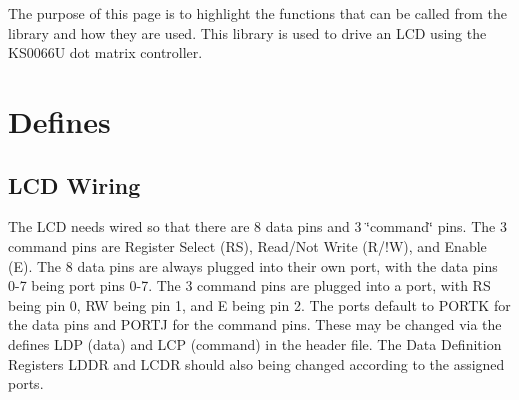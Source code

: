 The purpose of this page is to highlight the functions that can be called from the library and how they are used. This library is used to drive an L\-C\-D using the K\-S0066\-U dot matrix controller.\hypertarget{_usage_Defines}{}\section{Defines}\label{_usage_Defines}
\hypertarget{_usage_Wiring}{}\subsection{L\-C\-D Wiring}\label{_usage_Wiring}
The L\-C\-D needs wired so that there are 8 data pins and 3 \char`\"{}command\char`\"{} pins. The 3 command pins are Register Select (R\-S), Read/\-Not Write (R/!\-W), and Enable (E). The 8 data pins are always plugged into their own port, with the data pins 0-\/7 being port pins 0-\/7. The 3 command pins are plugged into a port, with R\-S being pin 0, R\-W being pin 1, and E being pin 2. The ports default to P\-O\-R\-T\-K for the data pins and P\-O\-R\-T\-J for the command pins. These may be changed via the defines L\-D\-P (data) and L\-C\-P (command) in the header file. The Data Definition Registers L\-D\-D\-R and L\-C\-D\-R should also being changed according to the assigned ports.

